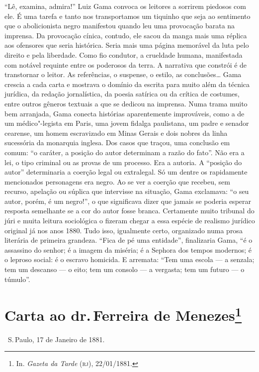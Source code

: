 {\small\noindent
``Lê, examina, admira!'' Luiz Gama convoca os leitores a sorrirem
piedosos com ele. É uma tarefa e tanto nos transportamos um tiquinho que
seja ao sentimento que o abolicionista negro manifestou quando leu uma
provocação barata na imprensa. Da provocação cínica, contudo, ele sacou
da manga mais uma réplica aos ofensores que seria histórica. Seria mais
uma página memorável da
luta pelo direito e pela liberdade. Como fio condutor, a crueldade
humana, manifestada com notável requinte entre os poderosos da terra. A
narrativa que constrói é de transtornar o leitor. As referências, o
suspense, o estilo, as conclusões\ldots{} Gama crescia a cada carta e
mostrava o domínio da escrita para muito além da técnica jurídica, da
redação jornalística, da poesia satírica ou da crítica de costumes,
entre outros gêneros textuais a que se dedicou na imprensa. Numa trama
muito bem arranjada, Gama conecta histórias aparentemente improváveis,
como a de um médico"-legista em Paris, uma jovem fidalga paulistana, um
padre e senador cearense, um homem escravizado em Minas Gerais e dois
nobres da linha sucessória da monarquia inglesa. Dos casos que traçou,
uma conclusão em comum: ``o caráter, a posição do autor determinam a
razão do fato''. Não era a lei, o tipo criminal ou as provas de um
processo. Era a autoria. A ``posição do autor'' determinaria a coerção
legal ou extralegal. Só um dentre os rapidamente mencionados personagens
era negro. Ao se ver a coerção que recebeu, sem recurso, apelação ou
súplica que intervisse na situação, Gama exclamava: ``o seu autor, porém,
é um negro!'', o que significava dizer que jamais se poderia esperar
resposta semelhante se a cor do autor fosse branca. Certamente muito
tribunal do júri e muita leitura sociológica o fizeram chegar a essa
espécie de realismo jurídico original já nos anos 1880. Tudo isso,
igualmente certo, organizado numa prosa literária de primeira grandeza.
``Fica de pé uma entidade'', finalizaria Gama, ``é o assassino do senhor; é
a imagem da miséria; é a Sephora dos tempos modernos; é o leproso
social: é o escravo homicida. E arremata: ``Tem uma escola --- a senzala;
tem um descanso --- o eito; tem um consolo --- a vergasta; tem um futuro
--- o túmulo''. }

\chapter{Carta ao dr.\,Ferreira de Menezes\footnote[*]{In.
  \emph{Gazeta da Tarde} (\textsc{rj}), 22/01/1881.}}


\hfill\ S.\,Paulo, 17 de Janeiro de 1881.\bigskip


